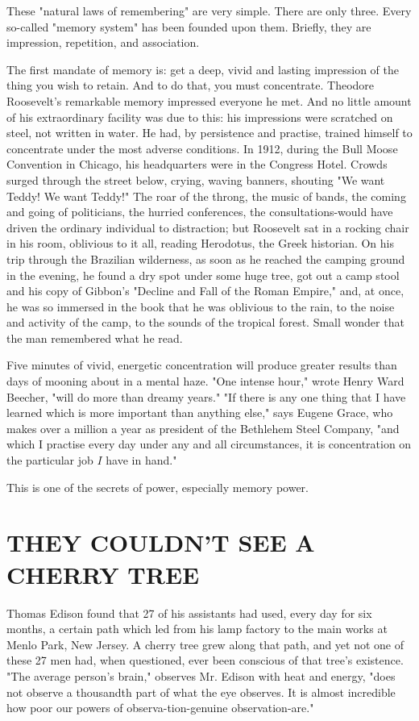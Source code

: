 \documentclass[10pt]{article}
\begin{document}
These "natural laws of remembering" are very simple. There are only three. Every so-called "memory system" has been founded upon them. Briefly, they are impression, repetition, and association.

The first mandate of memory is: get a deep, vivid and lasting impression of the thing you wish to retain. And to do that, you must concentrate. Theodore Roosevelt's remarkable memory impressed everyone he met. And no little amount of his extraordinary facility was due to this: his impressions were scratched on steel, not written in water. He had, by persistence and practise, trained himself to\\
concentrate under the most adverse conditions. In 1912, during the Bull Moose Convention in Chicago, his headquarters were in the Congress Hotel. Crowds surged through the street below, crying, waving banners, shouting "We want Teddy! We want Teddy!" The roar of the throng, the music of bands, the coming and going of politicians, the hurried conferences, the consultations-would have driven the ordinary individual to distraction; but Roosevelt sat in a rocking chair in his room, oblivious to it all, reading Herodotus, the Greek historian. On his trip through the Brazilian wilderness, as soon as he reached the camping ground in the evening, he found a dry spot under some huge tree, got out a camp stool and his copy of Gibbon's "Decline and Fall of the Roman Empire," and, at once, he was so immersed in the book that he was oblivious to the rain, to the noise and activity of the camp, to the sounds of the tropical forest. Small wonder that the man remembered what he read.

Five minutes of vivid, energetic concentration will produce greater results than days of mooning about in a mental haze. "One intense hour," wrote Henry Ward Beecher, "will do more than dreamy years." "If there is any one thing that I have learned which is more important than anything else," says Eugene Grace, who makes over a million a year as president of the Bethlehem Steel Company, "and which I practise every day under any and all circumstances, it is concentration on the particular job $I$ have in hand."

This is one of the secrets of power, especially memory power.

\section*{THEY COULDN'T SEE A CHERRY TREE}
Thomas Edison found that 27 of his assistants had used, every day for six months, a certain path which led from his lamp factory to the main works at Menlo Park, New Jersey. A cherry tree grew along that path, and yet not one of these 27 men had, when questioned, ever been conscious of that tree's existence.\\
"The average person's brain," observes Mr. Edison with heat and energy, "does not observe a thousandth part of what the eye observes. It is almost incredible how poor our powers of observa-tion-genuine observation-are."
\end{document}
